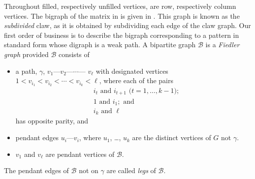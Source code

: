 \documentclass[preprint,12pt]{elsarticle}
\begin{document}
 Throughout filled, respectively unfilled vertices, are row, respectively column vertices. 
The bigraph of the matrix in  is
given in 
. This graph is known as the \textit{subdivided} claw, as it is obtained by subdividing each edge of the claw graph. 
Our first order of business is to describe the bigraph corresponding to a pattern in standard form whose digraph is a weak path.  
A bipartite graph $\mathcal{B}$ is a \textit{Fiedler graph} provided $\mathcal{B}$  consists of 
\begin{itemize}
\item[(a)]  a path, $\gamma$,
$v_1$---$v_2$---$\cdots$--- $v_\ell$
with designated vertices
$1<v_{i_1}<v_{i_2}< \cdots <v_{i_k}< \ell$,
where each of the pairs 
\begin{align*} 
&\mbox{$i_t$ and $i_{t+1}$ ($t=1,\ldots, k-1$)};\\
&\mbox{$1$ and $i_1$}; \mbox{ and }\\
&\mbox{$i_k$  and $\ell$}
\end{align*}
has opposite parity, and  
\item[(b)]
pendant edges $u_i$---$v_i$, where $u_1$, 
\ldots, $u_k$ are the distinct vertices of $G$
not  $\gamma$. 
\item[(c)] $v_1$ and $v_{\ell}$ are pendant vertices of $\mathcal{B}$. 
\end{itemize}
The pendant edges of $\mathcal{B}$ not on $\gamma$ are called \textit{legs}
of $\mathcal{B}$. 
\end{document}
